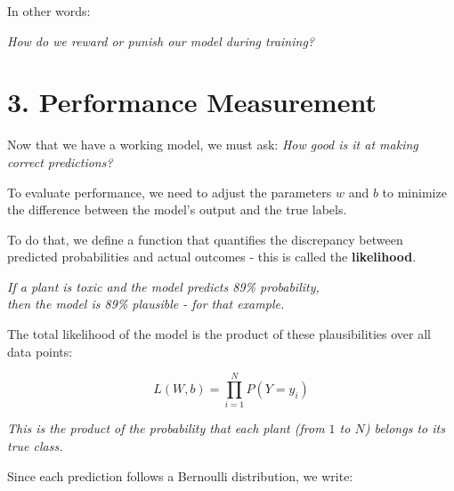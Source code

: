 \documentclass[11pt]{article}
\begin{document}
In other words:

\begin{center}
\itshape
How do we reward or punish our model during training?
\end{center}

\section*{3. Performance Measurement}

Now that we have a working model, we must ask:  
\textit{How good is it at making correct predictions?}

\vspace{0.5em}

To evaluate performance, we need to adjust the parameters $w$ and $b$ to minimize the difference between the model's output and the true labels.

\vspace{1em}

To do that, we define a function that quantifies the discrepancy between predicted probabilities and actual outcomes - this is called the \textbf{likelihood}.

\vspace{1em}

\begin{tcolorbox}[colback=gray!8, colframe=gray!50!black, sharp corners=southwest, boxrule=0.3mm]
\centering
\textit{If a plant is toxic and the model predicts 89\% probability,}\\
\textit{then the model is 89\% plausible - for that example.}
\end{tcolorbox}

\vspace{1em}

The total likelihood of the model is the product of these plausibilities over all data points:

\[
L(W, b) = \prod_{i=1}^{N} P(Y = y_i)
\]

\vspace{0.5em}

\begin{tcolorbox}[colback=gray!6, colframe=gray!40!black, boxrule=0.25mm]
\centering
\textit{This is the product of the probability that each plant (from $1$ to $N$) belongs to its true class.}
\end{tcolorbox}

\vspace{1em}

Since each prediction follows a Bernoulli distribution, we write:
\end{document}
